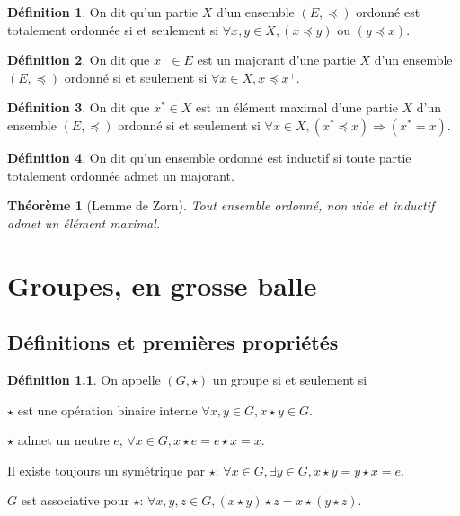 \documentclass[a4paper, 11pt, french]{book}
\newenvironment{itemise}{\itemize}{\enditemize}
\theoremstyle{plain} %
\newtheorem{theoreme}{Théorème}
\theoremstyle{definition} %
\newtheorem{definition}{Définition}
\theoremstyle{remark} %
\newcommand{\1}{\mathds{1}}
\newcommand\ou{\text{ ou }}
\begin{document}
\begin{definition}
	On dit qu'un partie $X$ d'un ensemble $(E, \preccurlyeq)$ ordonné est totalement ordonnée si et seulement si $\forall x, y\in X, (x\preccurlyeq y)\ou(y\preccurlyeq x)$.
\end{definition}


\begin{definition}
	On dit que $x^+\in E$ est un majorant d'une partie $X$ d'un ensemble $(E, \preccurlyeq)$ ordonné si et seulement si $\forall x\in X, x\preccurlyeq x^+$.
\end{definition}

\begin{definition}
	On dit que $x^*\in X$ est un élément maximal d'une partie $X$ d'un ensemble $(E, \preccurlyeq)$ ordonné si et seulement si $\forall x\in X, (x^*\preccurlyeq x)\Rightarrow(x^*=x)$.
\end{definition}


\begin{definition}
	On dit qu'un ensemble ordonné est inductif si toute partie totalement ordonnée admet un majorant.
\end{definition}

\begin{theoreme}[Lemme de Zorn]
	Tout ensemble ordonné, non vide et inductif admet un élément maximal.
\end{theoreme}

\chapter{Groupes, en grosse balle}

\section{Définitions et premières propriétés}

\begin{definition}
	On appelle $(G, \star)$ un groupe si et seulement si
	\begin{itemise}
		\item $\star$ est une opération binaire interne $\forall x, y\in G, x\star y\in G$.
		\item $\star$ admet un neutre $e$, $\forall x\in G, x\star e=e\star x=x$.
		\item Il existe toujours un symétrique par $\star$: $\forall x\in G, \exists y\in G, x\star y=y\star x=e$.
		\item $G$ est associative pour $\star$: $\forall x, y, z\in G, (x\star y)\star z=x\star(y\star z)$.
	\end{itemise}
\end{definition}
\end{document}
